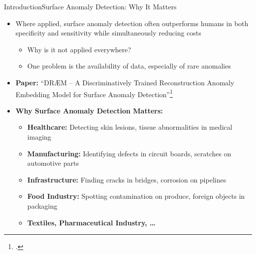 \begin{frame}{Introduction}{Surface Anomaly Detection: Why It Matters}
    \begin{itemize}
        \item Where applied, surface anomaly detection often outperforms humans in both specificity and sensitivity while simultaneously reducing costs
        \pause
        \begin{itemize}
            \item Why is it not applied everywhere?
            \pause
            \item One problem is the availability of data, especially of rare anomalies
        \end{itemize}
        \pause
        
        \item \textbf{Paper:} ``DRÆM -- A Discriminatively Trained Reconstruction Anomaly Embedding Model for Surface Anomaly Detection''\footcite{zavrtanikDRAEMDiscriminativelyTrained2021}
        \pause
        
        \item \textbf{Why Surface Anomaly Detection Matters:}
        \begin{itemize}
            \item \textbf{Healthcare:} Detecting skin lesions, tissue abnormalities in medical imaging
            \item \textbf{Manufacturing:} Identifying defects in circuit boards, scratches on automotive parts
            \item \textbf{Infrastructure:} Finding cracks in bridges, corrosion on pipelines
            \item \textbf{Food Industry:} Spotting contamination on produce, foreign objects in packaging
            \item \textbf{Textiles, Pharmaceutical Industry, \ldots}
        \end{itemize}
    \end{itemize}
\end{frame}

